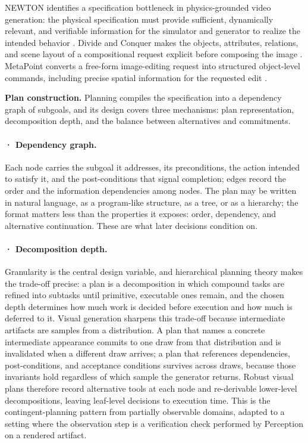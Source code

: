 NEWTON identifies a specification bottleneck in physics-grounded video generation: the physical specification must provide sufficient, dynamically relevant, and verifiable information for the simulator and generator to realize the intended behavior \cite{feng2026newton}. Divide and Conquer makes the objects, attributes, relations, and scene layout of a compositional request explicit before composing the image \cite{wang2024divide}. MetaPoint converts a free-form image-editing request into structured object-level commands, including precise spatial information for the requested edit \cite{zhou2026metapoint}.

\textbf{Plan construction.} Planning compiles the specification into a dependency graph of subgoals, and its design covers three mechanisms: plan representation, decomposition depth, and the balance between alternatives and commitments.

\paragraph{· Dependency graph.} Each node carries the subgoal it addresses, its preconditions, the action intended to satisfy it, and the post-conditions that signal completion; edges record the order and the information dependencies among nodes. The plan may be written in natural language, as a program-like structure, as a tree, or as a hierarchy; the format matters less than the properties it exposes: order, dependency, and alternative continuation. These are what later decisions condition on.

\paragraph{· Decomposition depth.} Granularity is the central design variable, and hierarchical planning theory makes the trade-off precise: a plan is a decomposition in which compound tasks are refined into subtasks until primitive, executable ones remain, and the chosen depth determines how much work is decided before execution and how much is deferred to it. Visual generation sharpens this trade-off because intermediate artifacts are samples from a distribution. A plan that names a concrete intermediate appearance commits to one draw from that distribution and is invalidated when a different draw arrives; a plan that references dependencies, post-conditions, and acceptance conditions survives across draws, because those invariants hold regardless of which sample the generator returns. Robust visual plans therefore record alternative tools at each node and re-derivable lower-level decompositions, leaving leaf-level decisions to execution time. This is the contingent-planning pattern from partially observable domains, adapted to a setting where the observation step is a verification check performed by Perception on a rendered artifact.

